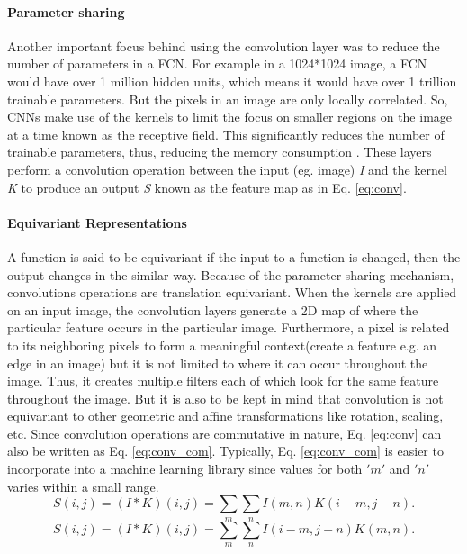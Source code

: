 \paragraph{Parameter sharing}
Another important focus behind using the convolution layer was to reduce the number of parameters in a \ac{FCN}. For example in a 1024*1024 image, a \ac{FCN} would have over 1 million hidden units, which means it would have over 1 trillion trainable parameters. But the pixels in an image are only locally correlated. So, \ac{CNN}s make use of the kernels to limit the focus on smaller regions on the image at a time known as the receptive field. This significantly reduces the number of trainable parameters, thus, reducing the memory consumption \cite{ConvNet}. These layers perform a convolution operation between the input (eg. image) \textit{I} and the kernel \textit{K} to produce an output \textit{S} known as the feature map as in Eq. \ref{eq:conv}.\cite{Goodfellow-et-al-2016}
\paragraph{Equivariant Representations} 
A function is said to be equivariant if the input to a function is changed, then the output changes in the similar way. Because of the parameter sharing mechanism, convolutions operations are translation equivariant. When the kernels are applied on an input image, the convolution layers generate a 2D map of where the particular feature occurs in the particular image. Furthermore, a pixel is related to its neighboring pixels to form a meaningful context(create a feature e.g. an edge in an image) but it is not limited to where it can occur throughout the image. Thus, it creates multiple filters each of which look for the same feature throughout the image. But it is also to be kept in mind that convolution is not equivariant to other geometric and affine transformations like rotation, scaling, etc. 
 Since convolution operations are commutative in nature, Eq. \ref{eq:conv} can also be written as Eq. \ref{eq:conv_com}. Typically, Eq. \ref{eq:conv_com} is easier to incorporate into a machine learning library since values for both $'m'$ and $'n'$ varies within a small range.\cite{Goodfellow-et-al-2016}
\begin{equation}
    \label{eq:conv}
    \mathit{S(i,j)}= \mathit{(I*K)(i,j)} = \sum_{m}\sum_{n}\mathit{I(m,n)K(i-m,j-n)}.
\end{equation}
\begin{equation}
    \label{eq:conv_com}
    \mathit{S(i,j)}= \mathit{(I*K)(i,j)} = \sum_{m}\sum_{n}\mathit{I(i-m,j-n)K(m,n)}.
\end{equation}

